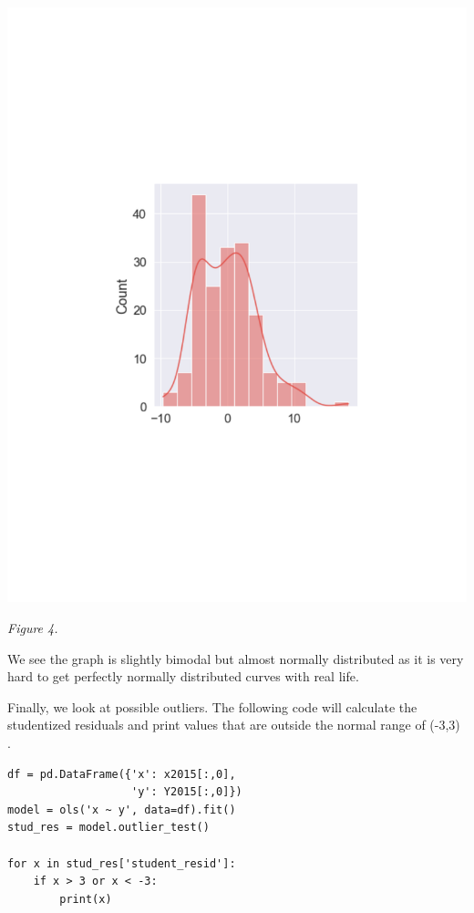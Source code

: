 \documentclass[12pt]{article}
\begin{document}
\begin{center}
    \includegraphics[width=6in]{Manuscript/figure6.pdf}\\
\end{center}

\begin{center}
\textit{Figure 4.}
\end{center}

\vspace{15pt}

\noindent
We see the graph is slightly bimodal but almost normally distributed as it is very hard to get perfectly normally distributed curves with real life.

\vspace{15pt}

\noindent
Finally, we look at possible outliers. The following code will calculate the studentized residuals and print values that are outside the normal range of (-3,3) \citep{statologyresiduals}.

\begin{lstlisting}
df = pd.DataFrame({'x': x2015[:,0],
                   'y': Y2015[:,0]})
model = ols('x ~ y', data=df).fit()
stud_res = model.outlier_test()

for x in stud_res['student_resid']:
    if x > 3 or x < -3:
        print(x)
\end{lstlisting}
\end{document}

